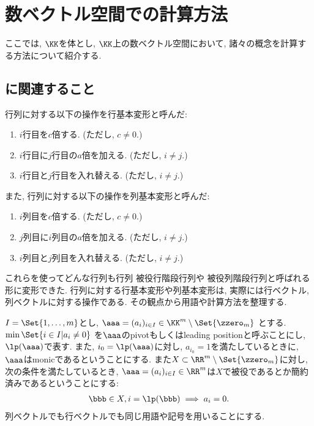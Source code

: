 

\chapter{数ベクトル空間での計算方法}

ここでは,
$\KK$を体とし,
$\KK$上の数ベクトル空間において,
諸々の概念を計算する方法について紹介する.

\section{に関連すること}
行列に対する以下の操作を行基本変形と呼んだ:
\begin{enumerate}
\item $i$行目を$c$倍する. (ただし, $c\neq 0$.)
\item $i$行目に$j$行目の$a$倍を加える. (ただし, $i\neq j$.)
\item $i$行目と$j$行目を入れ替える. (ただし, $i\neq j$.)
\end{enumerate}
また,
行列に対する以下の操作を列基本変形と呼んだ:
\begin{enumerate}
\item $i$列目を$c$倍する. (ただし, $c\neq 0$.)
\item $j$列目に$i$列目の$a$倍を加える. (ただし, $i\neq j$.)
\item $i$列目と$j$列目を入れ替える. (ただし, $i\neq j$.)
\end{enumerate}
これらを使ってどんな行列も行列
被役行階段行列や
被役列階段行列と呼ばれる形に変形できた.
行列に対する行基本変形や列基本変形は,
実際には行ベクトル, 列ベクトルに対する操作である.
その観点から用語や計算方法を整理する.

$I=\Set{1,\ldots,m}$とし,
$\aaa=(a_i)_{i\in I}\in \KK^m\setminus\Set{\zzero_m}$
とする.
$\min\Set{i\in I |a_i\neq 0}$
を$\aaa$のpivotもしくはleading positionと呼ぶことにし,
$\lp(\aaa)$で表す.
また,
$i_0=\lp(\aaa)$に対し,
$a_{i_0}=1$を満たしているときに,
$\aaa$はmonicであるということにする.
また$X\subset \RR^m\setminus\Set{\zzero_m}$に対し,
次の条件を満たしているとき, $\aaa=(a_i)_{i\in I}\in\RR^m$は$X$で被役であるとか簡約済みであるということにする:
\begin{align*}
  \bbb\in X, i=\lp(\bbb) \implies
  a_{i}=0.
\end{align*}
列ベクトルでも行ベクトルでも同じ用語や記号を用いることにする.

